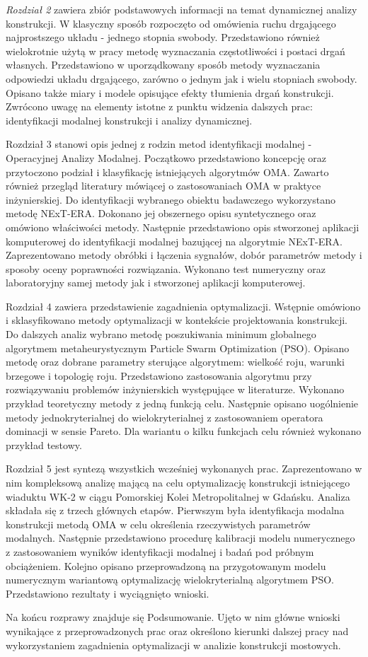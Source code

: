 \textit{Rozdział 2} zawiera zbiór podstawowych informacji na temat dynamicznej analizy konstrukcji. W klasyczny sposób rozpoczęto od omówienia ruchu drgającego najprostszego układu - jednego stopnia swobody. Przedstawiono również wielokrotnie użytą w pracy metodę wyznaczania częstotliwości i postaci drgań własnych. Przedstawiono w uporządkowany sposób metody wyznaczania odpowiedzi układu drgającego, zarówno o jednym jak i wielu stopniach swobody. Opisano także miary i modele opisujące efekty tłumienia drgań konstrukcji. Zwrócono uwagę na elementy istotne z punktu widzenia dalszych prac: identyfikacji modalnej konstrukcji i analizy dynamicznej.

Rozdział 3 stanowi opis jednej z rodzin metod identyfikacji modalnej - Operacyjnej Analizy Modalnej. Początkowo przedstawiono koncepcję oraz przytoczono podział i klasyfikację istniejących algorytmów OMA. Zawarto również przegląd literatury mówiącej o zastosowaniach OMA w praktyce inżynierskiej. Do identyfikacji wybranego obiektu badawczego wykorzystano metodę NExT-ERA. Dokonano jej obszernego opisu syntetycznego oraz omówiono właściwości metody. Następnie przedstawiono opis stworzonej aplikacji komputerowej do identyfikacji modalnej bazującej na algorytmie NExT-ERA. Zaprezentowano metody obróbki i łączenia sygnałów, dobór parametrów metody i sposoby oceny poprawności rozwiązania. Wykonano test numeryczny oraz laboratoryjny samej metody jak i stworzonej aplikacji komputerowej.

Rozdział 4 zawiera przedstawienie zagadnienia optymalizacji. Wstępnie omówiono i sklasyfikowano metody optymalizacji w kontekście projektowania konstrukcji. Do dalszych analiz wybrano metodę poszukiwania minimum globalnego algorytmem metaheurystycznym Particle Swarm Optimization (PSO). Opisano metodę oraz dobrane parametry sterujące algorytmem: wielkość roju, warunki brzegowe i topologię roju. Przedstawiono zastosowania algorytmu przy rozwiązywaniu problemów inżynierskich występujące w literaturze. Wykonano przykład teoretyczny metody z jedną funkcją celu. Następnie opisano uogólnienie metody jednokryterialnej do wielokryterialnej z zastosowaniem operatora dominacji w sensie Pareto. Dla wariantu o kilku funkcjach celu również wykonano przykład testowy.

Rozdział 5 jest syntezą wszystkich wcześniej wykonanych prac. Zaprezentowano w nim kompleksową analizę mającą na celu optymalizację konstrukcji istniejącego wiaduktu WK-2 w ciągu Pomorskiej Kolei Metropolitalnej w Gdańsku. Analiza składała się z trzech głównych etapów. Pierwszym była identyfikacja modalna konstrukcji metodą OMA w celu określenia rzeczywistych parametrów modalnych. Następnie przedstawiono procedurę kalibracji modelu numerycznego z zastosowaniem wyników identyfikacji modalnej i badań pod próbnym obciążeniem. Kolejno opisano przeprowadzoną na przygotowanym modelu numerycznym wariantową optymalizację wielokryterialną algorytmem PSO. Przedstawiono rezultaty i wyciągnięto wnioski.

Na końcu rozprawy znajduje się Podsumowanie. Ujęto w nim główne wnioski wynikające z przeprowadzonych prac oraz określono kierunki dalszej pracy nad wykorzystaniem zagadnienia optymalizacji w analizie konstrukcji mostowych.





